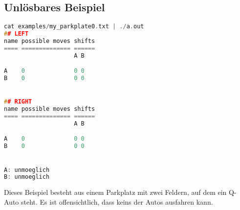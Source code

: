 \documentclass[a4paper,10pt,ngerman]{scrartcl}
\begin{document}
\subsection*{Unlösbares Beispiel}
\begin{lstlisting}[language=C++]
cat examples/my_parkplate0.txt | ./a.out
## LEFT
name possible moves shifts
==== ============== ======
                    A B

A    0              0 0
B    0              0 0


## RIGHT
name possible moves shifts
==== ============== ======
                    A B

A    0              0 0
B    0              0 0


A: unmoeglich
B: unmoeglich
\end{lstlisting}
Dieses Beispiel besteht aus einem Parkplatz mit zwei Feldern, auf dem ein Q-Auto steht.
Es ist offensichtlich, dass keins der Autos ausfahren kann.
\end{document}
